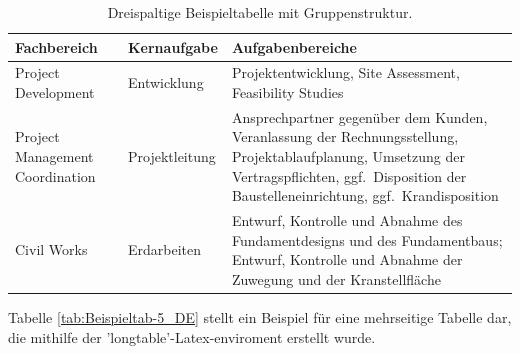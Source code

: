 \begin{table}[htbp!]
	\centering
	\caption[Dreispaltige Beispieltabelle mit Gruppenstruktur.]{Dreispaltige Beispieltabelle mit Gruppenstruktur.}
	\begin{tabularx}{\textwidth}{l l X}
		\toprule
		\textbf{Fachbereich} & \textbf{Kernaufgabe} & \textbf{Aufgabenbereiche}\\
		\midrule
		Project Development & Entwicklung & Projektentwicklung, Site Assessment, Feasibility Studies\\
		\midrule
		Project Management Coordination & Projektleitung & Ansprechpartner gegenüber dem Kunden, Veranlassung der Rechnungsstellung, Projektablaufplanung, Umsetzung der Vertragspflichten, ggf.\ Disposition der Baustelleneinrichtung, ggf.\ Krandisposition\\
		\midrule
		Civil Works & Erdarbeiten & Entwurf, Kontrolle und Abnahme des Fundamentdesigns und des Fundamentbaus; Entwurf, Kontrolle und Abnahme der Zuwegung und der Kranstellfläche\\
		\bottomrule
	\end{tabularx}
	\label{tab:Beispieltab-4_DE}
\end{table}


Tabelle \ref{tab:Beispieltab-5_DE} stellt ein Beispiel für eine mehrseitige Tabelle dar, die mithilfe der 'longtable'-Latex-enviroment erstellt wurde.


